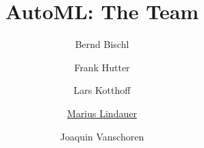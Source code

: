 




\title[AutoML: The Team]{AutoML: The Team}
\author[Marius Lindauer]{Bernd Bischl \and Frank Hutter \and Lars Kotthoff\newline \and \underline{Marius Lindauer} \and Joaquin Vanschoren}
\institute{}
\date{}





	
	\maketitle
	

